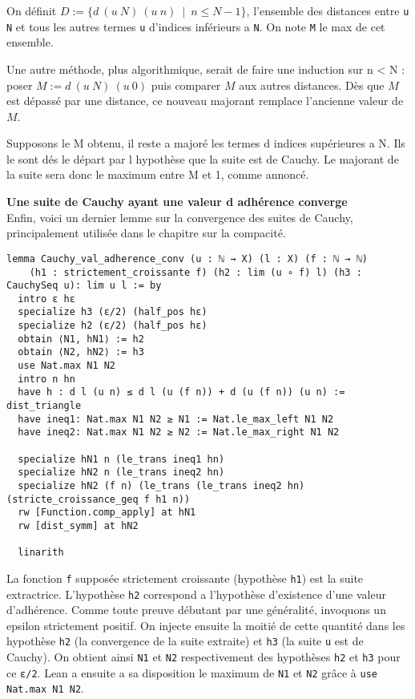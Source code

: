 \documentclass[a4paper, 12pt]{article}
\newcommand{\lean}[1]{\texttt{#1}}
\begin{document}
On définit $D := \{d\ (u\ N)\ (u\ n)\ \mid\ n \leq N-1\}$, l'ensemble des distances entre \lean{u N} et tous les autres termes \lean{u} d'indices inférieurs a \lean{N}. On note \lean{M} le max de cet ensemble.

Une autre méthode, plus algorithmique, serait de faire une induction sur n < N : poser $M := d\ (u\ N)\ (u\ 0)$ puis comparer $M$ aux autres distances. Dès que $M$ est dépassé par une distance, ce nouveau majorant remplace l'ancienne valeur de $M$.

Supposons le M obtenu, il reste a majoré les termes d indices supérieures a N. Ils le sont dés le départ par l hypothèse que la suite est de Cauchy. Le majorant de la suite sera donc le maximum entre M et 1, comme annoncé.


\textbf{Une suite de Cauchy ayant une valeur d adhérence converge}\\

Enfin, voici un dernier lemme sur la convergence des suites de Cauchy, principalement utilisée dans le chapitre sur la compacité.

\begin{verbatim}
lemma Cauchy_val_adherence_conv (u : ℕ → X) (l : X) (f : ℕ → ℕ)
    (h1 : strictement_croissante f) (h2 : lim (u ∘ f) l) (h3 : CauchySeq u): lim u l := by
  intro ε hε
  specialize h3 (ε/2) (half_pos hε)
  specialize h2 (ε/2) (half_pos hε)
  obtain ⟨N1, hN1⟩ := h2
  obtain ⟨N2, hN2⟩ := h3
  use Nat.max N1 N2
  intro n hn
  have h : d l (u n) ≤ d l (u (f n)) + d (u (f n)) (u n) := dist_triangle
  have ineq1: Nat.max N1 N2 ≥ N1 := Nat.le_max_left N1 N2
  have ineq2: Nat.max N1 N2 ≥ N2 := Nat.le_max_right N1 N2

  specialize hN1 n (le_trans ineq1 hn)
  specialize hN2 n (le_trans ineq2 hn)
  specialize hN2 (f n) (le_trans (le_trans ineq2 hn) (stricte_croissance_geq f h1 n))
  rw [Function.comp_apply] at hN1
  rw [dist_symm] at hN2

  linarith
\end{verbatim}

La fonction \lean{f} supposée strictement croissante (hypothèse \lean{h1}) est la suite extractrice. L'hypothèse \lean{h2} correspond a l'hypothèse d'existence d'une valeur d'adhérence. Comme toute preuve débutant par une généralité, invoquons un epsilon strictement positif. On injecte ensuite la moitié de cette quantité dans les hypothèse \lean{h2} (la convergence de la suite extraite) et \lean{h3} (la suite \lean{u} est de Cauchy).
On obtient ainsi \lean{N1} et \lean{N2} respectivement des hypothèses \lean{h2} et \lean{h3} pour ce \lean{ε/2}. Lean a ensuite a sa disposition le maximum de \lean{N1} et \lean{N2} grâce à \lean{use Nat.max N1 N2}.
\end{document}
